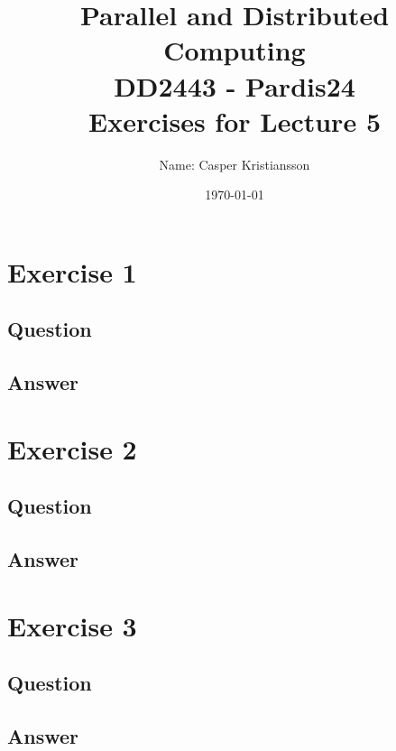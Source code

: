 \documentclass{article}
\title{\textbf{Parallel and Distributed Computing\\DD2443 - Pardis24\\Exercises for Lecture 5}}
\author{Name: Casper Kristiansson}
\date{\today}
\begin{document}
\setlength\parindent{0pt}
\setlength{\parskip}{\bigskipamount}

\maketitle

\section*{Exercise 1}
\subsection*{Question}

\subsection*{Answer}






\section*{Exercise 2}
\subsection*{Question}

\subsection*{Answer}







\section*{Exercise 3}
\subsection*{Question}

\subsection*{Answer}


\newpage
\printbibliography
\end{document}
